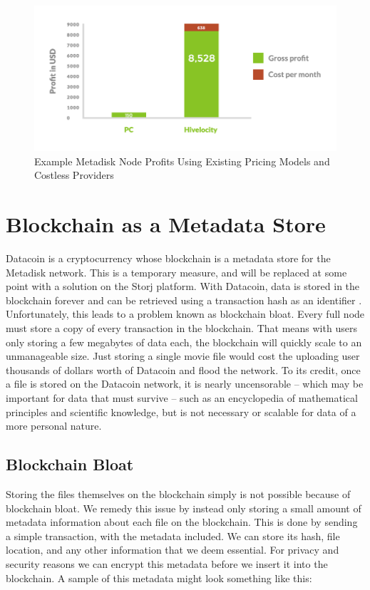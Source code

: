 \documentclass[a4paper,10pt]{article}
\begin{document}
\begin{figure}[h!]
  \centering
      \includegraphics[width=\linewidth]{05}
  \caption{Example Metadisk Node Profits Using Existing Pricing Models and Costless Providers}
\end{figure}


\section*{Blockchain as a Metadata Store}

Datacoin \cite{12} is a cryptocurrency whose blockchain is a metadata store for the Metadisk network. This is a temporary measure, and will be replaced at some point with a solution on the Storj platform.  With Datacoin, data is stored in the blockchain forever and can be retrieved using a transaction hash as an identifier \cite{12}. Unfortunately, this leads to a problem known as blockchain bloat. Every full node must store a copy of every transaction in the blockchain. That means with users only storing a few megabytes of data each, the blockchain will quickly scale to an unmanageable size. Just storing a single movie file would cost the uploading user thousands of dollars worth of Datacoin and flood the network. To its credit, once a file is stored on the Datacoin network, it is nearly uncensorable -- which may be important for data that must survive -- such as an encyclopedia of mathematical principles and scientific knowledge, but is not necessary or scalable for data of a more personal nature.

\subsection*{Blockchain Bloat}

Storing the files themselves on the blockchain simply is not possible because of blockchain bloat. We remedy this issue by instead only storing a small amount of metadata information about each file on the blockchain. This is done by sending a simple transaction, with the metadata included. We can store its hash, file location, and any other information that we deem essential. For privacy and security reasons we can encrypt this metadata before we insert it into the blockchain. A sample of this metadata might look something like this:\\
\end{document}
